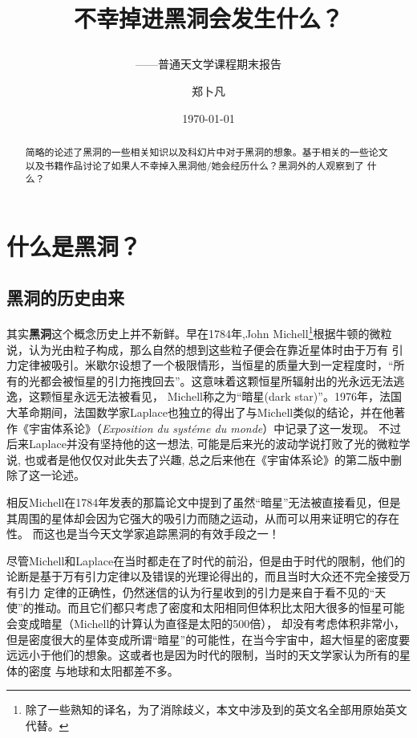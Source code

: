 \documentclass{ctexart}
\title{不幸掉进黑洞会发生什么？\\ \subtitle{——普通天文学课程期末报告}  } %
\author{郑卜凡\quad2021302022016}                     %
\date{\today}                             %
\begin{document}
    \maketitle              %
    \begin{abstract}
        简略的论述了黑洞的一些相关知识以及科幻片中对于黑洞的想象。基于相关的一些论文以及书籍作品讨论了如果人不幸掉入黑洞他/她会经历什么？黑洞外的人观察到了
        什么？
    \end{abstract}
    \tableofcontents        %
    \section{什么是黑洞？}
    \subsection{黑洞的历史由来}
        其实\textbf{黑洞}这个概念历史上并不新鲜。早在1784年,John Michell\footnote{除了一些熟知的译名，为了消除歧义，本文中涉及到的英文名全部用原始英文代替。}根据牛顿的微粒说，认为光由粒子构成，那么自然的想到这些粒子便会在靠近星体时由于万有
        引力定律被吸引。米歇尔设想了一个极限情形，当恒星的质量大到一定程度时，“所有的光都会被恒星的引力拖拽回去”。这意味着这颗恒星所辐射出的光永远无法逃逸，这颗恒星永远无法被看见，
        Michell称之为“暗星(dark star)”。1976年，法国大革命期间，法国数学家Laplace也独立的得出了与Michell类似的结论，并在他著作《宇宙体系论》（{\itshape Exposition du syst\'eme du monde}）中记录了这一发现。\cite{montgomery2009michell}
        不过后来Laplace并没有坚持他的这一想法, 可能是后来光的波动学说打败了光的微粒学说, 也或者是他仅仅对此失去了兴趣, 总之后来他在《宇宙体系论》的第二版中删除了这一论述。

        相反Michell在1784年发表的那篇论文中提到了虽然“暗星”无法被直接看见，但是其周围的星体却会因为它强大的吸引力而随之运动，从而可以用来证明它的存在性。\cite{1784michell}
        而这也是当今天文学家追踪黑洞的有效手段之一！

        尽管Michell和Laplace在当时都走在了时代的前沿，但是由于时代的限制，他们的论断是基于万有引力定律以及错误的光理论得出的，而且当时大众还不完全接受万有引力
        定律的正确性，仍然迷信的认为行星收到的引力是来自于看不见的“天使”的推动。\cite{feynman2011feynman}而且它们都只考虑了密度和太阳相同但体积比太阳大很多的恒星可能会变成暗星（Michell的计算认为直径是太阳的500倍），
        却没有考虑体积非常小，但是密度很大的星体变成所谓“暗星”的可能性，在当今宇宙中，超大恒星的密度要远远小于他们的想象。这或者也是因为时代的限制，当时的天文学家认为所有的星体的密度
        与地球和太阳都差不多。
        
\end{document}
